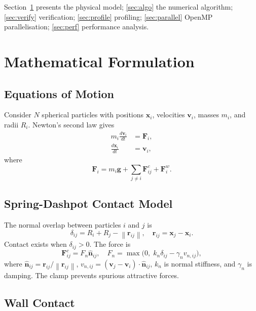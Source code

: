 \documentclass[10pt,twocolumn]{article}
\newcommand{\vv}[1]{\boldsymbol{#1}}
\newcommand{\norm}[1]{\left\|#1\right\|}
\begin{document}
Section~\ref{sec:model} presents the physical model;
\ref{sec:algo} the numerical algorithm;
\ref{sec:verify} verification;
\ref{sec:profile} profiling;
\ref{sec:parallel} OpenMP parallelisation;
\ref{sec:perf} performance analysis.

\section{Mathematical Formulation}\label{sec:model}

\subsection{Equations of Motion}

Consider $N$ spherical particles with positions $\vv{x}_i$, velocities
$\vv{v}_i$, masses $m_i$, and radii $R_i$.
Newton's second law gives
\begin{align}
  m_i \frac{d\vv{v}_i}{dt} &= \vv{F}_i ,\label{eq:newton}\\
  \frac{d\vv{x}_i}{dt}     &= \vv{v}_i ,\label{eq:kin}
\end{align}
where
\begin{equation}
  \vv{F}_i = m_i\vv{g}
           + \sum_{j\neq i}\vv{F}^c_{ij}
           + \vv{F}^w_i .\label{eq:force_total}
\end{equation}

\subsection{Spring-Dashpot Contact Model}

The normal overlap between particles $i$ and $j$ is
\begin{equation}
  \delta_{ij} = R_i+R_j-\norm{\vv{r}_{ij}},\quad
  \vv{r}_{ij}=\vv{x}_j-\vv{x}_i .\label{eq:overlap}
\end{equation}
Contact exists when $\delta_{ij}>0$.  The force is
\begin{equation}
  \vv{F}^c_{ij}=F_n\hat{\vv{n}}_{ij},\quad
  F_n=\max\!\bigl(0,\;k_n\delta_{ij}-\gamma_n v_{n,ij}\bigr),
  \label{eq:contact}
\end{equation}
where $\hat{\vv{n}}_{ij}=\vv{r}_{ij}/\norm{\vv{r}_{ij}}$,
$v_{n,ij}=(\vv{v}_j-\vv{v}_i)\cdot\hat{\vv{n}}_{ij}$,
$k_n$ is normal stiffness, and $\gamma_n$ is damping.
The clamp prevents spurious attractive forces.

\subsection{Wall Contact}
\end{document}
